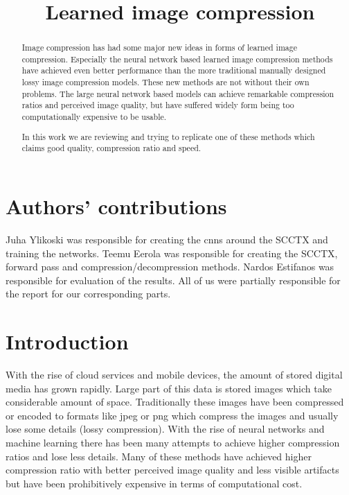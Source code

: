 \documentclass{article}
\title{Learned image compression}
\begin{document}
%
\maketitle
%
\begin{abstract}
Image compression has had some major new ideas in forms of learned image compression. 
Especially the neural network based learned image compression methods have achieved even better performance than the more traditional manually designed lossy image compression models.
These new methods are not without their own problems. The large neural network based models can achieve remarkable compression ratios and perceived image quality, but have suffered widely form being too computationally expensive to be usable.

In this work we are reviewing and trying to replicate one of these methods which claims good quality, compression ratio and speed.
\end{abstract}

\setcounter{section}{-1}

\section{Authors' contributions}

Juha Ylikoski was responsible for creating the cnns around the SCCTX and training the networks. Teemu Eerola was responsible for creating the SCCTX, forward pass and compression/decompression methods.
Nardos Estifanos was responsible for evaluation of the results.
All of us were partially responsible for the report for our corresponding parts.

\section{Introduction} %
\label{sec:intro}
With the rise of cloud services and mobile devices, the amount of stored digital media has grown rapidly. 
Large part of this data is stored images which take considerable amount of space.
Traditionally these images have been compressed or encoded to formats like jpeg or png which compress the images and usually lose some details (lossy compression).
With the rise of neural networks and machine learning there has been many attempts to achieve higher compression ratios and lose less details.
Many of these methods have achieved higher compression ratio with better perceived image quality and less visible artifacts but have been prohibitively expensive in terms of computational cost.
\end{document}
